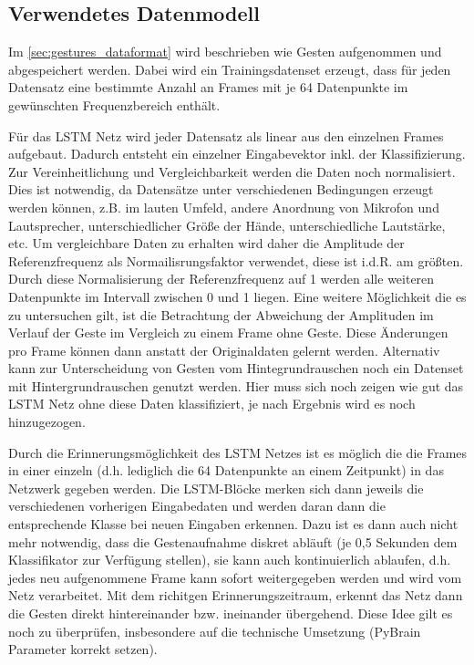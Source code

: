 \subsection{Verwendetes Datenmodell}
\label{sec:lstm_data}

Im \autoref{sec:gestures_dataformat} wird beschrieben wie Gesten aufgenommen und
abgespeichert werden. Dabei wird ein Trainingsdatenset erzeugt, dass für
jeden Datensatz eine bestimmte Anzahl an Frames mit je 64 Datenpunkte im
gewünschten Frequenzbereich enthält. 

Für das \ac{LSTM} Netz wird jeder Datensatz als linear aus den einzelnen Frames
aufgebaut. Dadurch entsteht ein einzelner Eingabevektor inkl. der
Klassifizierung. Zur Vereinheitlichung und Vergleichbarkeit werden die Daten
noch normalisiert.
Dies ist notwendig, da Datensätze unter verschiedenen Bedingungen erzeugt werden
können, z.B. im lauten Umfeld, andere Anordnung von Mikrofon und Lautsprecher,
unterschiedlicher Größe der Hände, unterschiedliche Lautstärke, etc. Um
vergleichbare Daten zu erhalten wird daher die Amplitude der Referenzfrequenz
als Normailisrungsfaktor verwendet, diese ist i.d.R. am größten. Durch diese
Normalisierung der Referenzfrequenz auf 1 werden alle weiteren Datenpunkte im
Intervall zwischen 0 und 1 liegen. Eine weitere Möglichkeit die es zu
untersuchen gilt, ist die Betrachtung der Abweichung der Amplituden im Verlauf
der Geste im Vergleich zu einem Frame ohne Geste. Diese Änderungen pro Frame
können dann anstatt der Originaldaten gelernt werden. Alternativ kann zur
Unterscheidung von Gesten vom Hintegrundrauschen noch ein Datenset mit
Hintergrundrauschen genutzt werden. Hier muss sich noch zeigen wie gut das
\ac{LSTM} Netz ohne diese Daten klassifiziert, je nach Ergebnis wird es noch
hinzugezogen. 

Durch die Erinnerungsmöglichkeit des \ac{LSTM} Netzes ist es möglich die die
Frames in einer einzeln (d.h. lediglich die 64 Datenpunkte an einem Zeitpunkt)
in das Netzwerk gegeben werden. Die \ac{LSTM}-Blöcke merken sich dann jeweils
die verschiedenen vorherigen Eingabedaten und werden daran dann die
entsprechende Klasse bei neuen Eingaben erkennen. Dazu ist es dann auch nicht
mehr notwendig, dass die Gestenaufnahme diskret abläuft (je 0,5 Sekunden dem
Klassifikator zur Verfügung stellen), sie kann auch kontinuierlich ablaufen,
d.h. jedes neu aufgenommene Frame kann sofort weitergegeben werden und wird vom
Netz verarbeitet. Mit dem richitgen Erinnerungszeitraum, erkennt das Netz dann
die Gesten direkt hintereinander bzw. ineinander übergehend. Diese Idee gilt es
noch zu überprüfen, insbesondere auf die technische Umsetzung (PyBrain
Parameter korrekt setzen).




\nocite{GERS2001,WIKI2013,Schmidhuber2013,LSTM1,Nerbonne1}